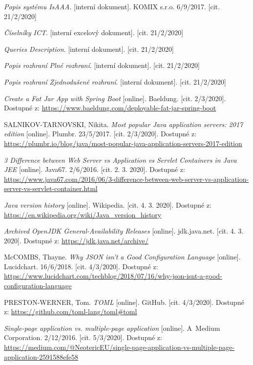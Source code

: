 \documentclass[thesis=M,czech]{FITthesis}[2019/12/23]
\begin{document}

\begin{thebibliography}{9}
	\textit{Popis systému IsAAA}. [interní dokument]. KOMIX s.r.o. 6/9/2017. [cit. 21/2/2020]
	
	\textit{Číselníky ICT}. [interní excelový dokument]. [cit. 21/2/2020]
	
	\textit{Queries Description}. [interní dokument]. [cit. 21/2/2020]
	
	\textit{Popis rozhraní Plné rozhraní}. [interní dokument]. [cit. 21/2/2020]
		
	\textit{Popis rozhraní Zjednodušené rozhraní}. [interní dokument]. [cit. 21/2/2020]

	\textit{Create a Fat Jar App with Spring Boot} [online]. Baeldung. [cit. 2/3/2020]. Dostupné z: \url{https://www.baeldung.com/deployable-fat-jar-spring-boot}

	SALNIKOV-TARNOVSKI, Nikita. \textit{Most popular Java application servers: 2017 edition} [online]. Plumbr. 23/5/2017. [cit. 2/3/2020]. Dostupné z: \url{https://plumbr.io/blog/java/most-popular-java-application-servers-2017-edition}

	\textit{3 Difference between Web Server vs Application vs Servlet Containers in Java JEE} [online]. Java67. 2/6/2016. [cit. 2. 3. 2020]. Dostupné z: \url{https://www.java67.com/2016/06/3-difference-between-web-server-vs-application-server-vs-servlet-container.html}
	
	\textit{Java version history} [online]. Wikipedia. [cit. 4. 3. 2020]. Dostupné z: \url{https://en.wikipedia.org/wiki/Java_version_history}
	
	\textit{Archived OpenJDK General-Availability Releases} [online]. jdk.java.net. [cit. 4. 3. 2020]. Dostupné z: \url{https://jdk.java.net/archive/}	
	
	McCOMBS, Thayne. \textit{Why JSON isn’t a Good Configuration Language} [online]. Lucidchart. 16/6/2018. [cit. 4/3/2020]. Dostupné z: \url{https://www.lucidchart.com/techblog/2018/07/16/why-json-isnt-a-good-configuration-language}

PRESTON-WERNER, Tom. \textit{TOML} [online]. GitHub. [cit. 4/3/2020]. Dostupné z: \url{https://github.com/toml-lang/toml#toml}

	\textit{Single-page application vs. multiple-page application} [online]. A~Medium Corporation. 2/12/2016. [cit. 5/3/2020]. Dostupné z: \url{https://medium.com/@NeotericEU/single-page-application-vs-multiple-page-application-2591588efe58}
	

\end{thebibliography}
\end{document}
